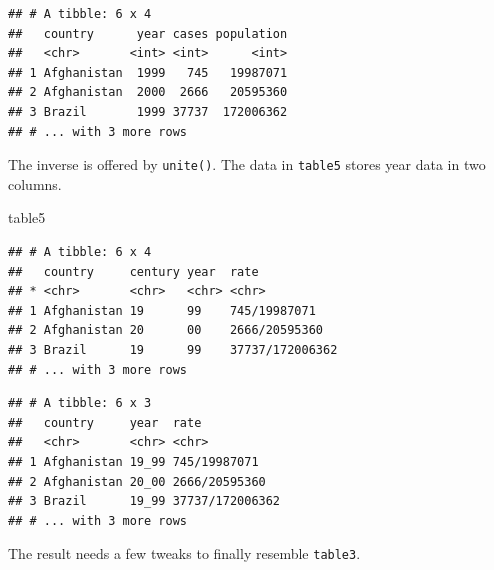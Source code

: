\documentclass[]{book}
\newenvironment{Shaded}{}{}
\newcommand{\DataTypeTok}[1]{#1}
\newcommand{\KeywordTok}[1]{\textcolor[rgb]{0.00,0.00,1.00}{#1}}
\newcommand{\NormalTok}[1]{#1}
\newcommand{\OperatorTok}[1]{#1}
\newcommand{\StringTok}[1]{\textcolor[rgb]{0.00,0.50,0.50}{#1}}
\begin{document}
\begin{verbatim}
## # A tibble: 6 x 4
##   country      year cases population
##   <chr>       <int> <int>      <int>
## 1 Afghanistan  1999   745   19987071
## 2 Afghanistan  2000  2666   20595360
## 3 Brazil       1999 37737  172006362
## # ... with 3 more rows
\end{verbatim}

The inverse is offered by \texttt{unite()}.
The data in \texttt{table5} stores year data in two columns.

\begin{Shaded}
\begin{Highlighting}[]
\NormalTok{table5}
\end{Highlighting}
\end{Shaded}

\begin{verbatim}
## # A tibble: 6 x 4
##   country     century year  rate           
## * <chr>       <chr>   <chr> <chr>          
## 1 Afghanistan 19      99    745/19987071   
## 2 Afghanistan 20      00    2666/20595360  
## 3 Brazil      19      99    37737/172006362
## # ... with 3 more rows
\end{verbatim}

\begin{Shaded}
\end{Shaded}

\begin{verbatim}
## # A tibble: 6 x 3
##   country     year  rate           
##   <chr>       <chr> <chr>          
## 1 Afghanistan 19_99 745/19987071   
## 2 Afghanistan 20_00 2666/20595360  
## 3 Brazil      19_99 37737/172006362
## # ... with 3 more rows
\end{verbatim}

The result needs a few tweaks to finally resemble \texttt{table3}.

\begin{Shaded}
\end{Shaded}
\end{document}
